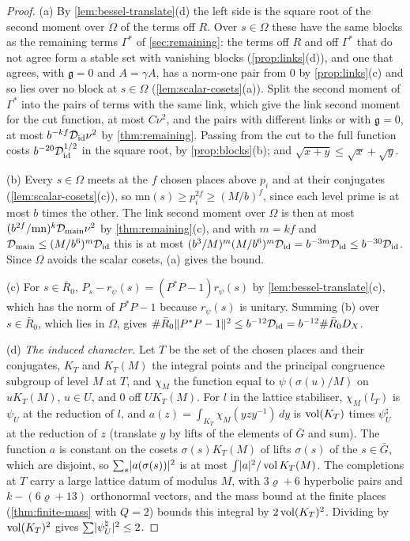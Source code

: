 \begin{proof}
(a) By \cref{lem:bessel-translate}(d) the left side is the square root of the second moment over $\Omega$ of the terms off $R$. Over $s\in\Omega$ these have the same blocks as the remaining terms $\Gamma^*$ of \cref{sec:remaining}: the terms off $R$ and off $\Gamma^*$ that do
not agree form a stable set with vanishing blocks (\cref{prop:links}(d)), and one that agrees, with $\mathfrak g=0$ and $A=\gamma A$, has a norm-one pair from $0$ by \cref{prop:links}(c) and so lies over no block at $s\in\Omega$ (\cref{lem:scalar-cosets}(a)). Split the second moment of
$\Gamma^*$ into the pairs of terms with the same link, which give the link second moment for the cut function, at most $C\nu^2$, and the pairs with different links or with $\mathfrak g=0$, at most $b^{-kf}\mathcal D_{\rm id}\nu^2$ by \cref{thm:remaining}. Passing from the cut to the full
function costs $b^{-20}\mathcal D_{\rm id}^{1/2}$ in the square root, by \cref{prop:blocks}(b); and $\sqrt{x+y}\le\sqrt x+\sqrt y$.

(b) Every $s\in\Omega$ meets at the $f$ chosen places above $p_i$ and at their conjugates (\cref{lem:scalar-cosets}(c)), so $\mathrm{mn}(s)\ge p_i^{2f}\ge(M/b)^f$, since each level prime is at most $b$ times the other. The link second moment over $\Omega$ is then at most
$(b^{2f}/\mathrm{mn})^k\mathcal D_{\rm main}\nu^2$ by \cref{thm:remaining}(c), and with $m=kf$ and $\mathcal D_{\rm main}\le(M/b^6)^m\mathcal D_{\rm id}$ this is at most $(b^3/M)^m(M/b^6)^m\mathcal D_{\rm id}=b^{-3m}\mathcal D_{\rm id}\le b^{-30}\mathcal D_{\rm id}$. Since $\Omega$ avoids the scalar cosets, (a) gives the bound.

(c) For $s\in\bar R_0$, $P_s-r_\psi(s)=(P^*P-1)r_\psi(s)$ by \cref{lem:bessel-translate}(c), which has the norm of $P^*P-1$ because $r_\psi(s)$ is unitary. Summing (b) over $s\in\bar R_0$, which lies in $\Omega$, gives $\#\bar R_0\lVert P^*P-1\rVert^2\le b^{-12}\mathcal D_{\rm id}=b^{-12}\#\bar R_0D_X$.

(d) \emph{The induced character.} Let $T$ be the set of the chosen places and their conjugates, $K_T$ and $K_T(M)$ the integral points and the principal congruence subgroup of level $M$ at $T$, and $\chi_M$ the function equal to $\psi(\sigma(u)/M)$ on $uK_T(M)$, $u\in U$, and $0$ off $UK_T(M)$.
For $l$ in the lattice stabiliser, $\chi_M(l_T)$ is $\psi_U$ at the reduction of $l$, and $a(z)=\int_{K_T}\chi_M(yzy^{-1})\,dy$ is $\operatorname{vol}(K_T)$ times $\psi^\natural_U$ at the reduction of $z$ (translate $y$ by lifts of the elements of $\bar G$ and sum). The function $a$ is constant on the
cosets $\sigma(s)K_T(M)$ of lifts $\sigma(s)$ of the $s\in\bar G$, which are disjoint, so $\sum_s\lvert a(\sigma(s))\rvert^2$ is at most $\int\lvert a\rvert^2/\operatorname{vol} K_T(M)$. The completions at $T$ carry a large lattice datum of modulus $M$, with $3\varrho+6$ hyperbolic pairs and $k-(6\varrho+13)$
orthonormal vectors, and the mass bound at the finite places (\cref{thm:finite-mass} with $Q=2$) bounds this integral by $2\operatorname{vol}(K_T)^2$. Dividing by $\operatorname{vol}(K_T)^2$ gives $\sum\lvert \psi^\natural_U\rvert^2\le2$.


\end{proof}
